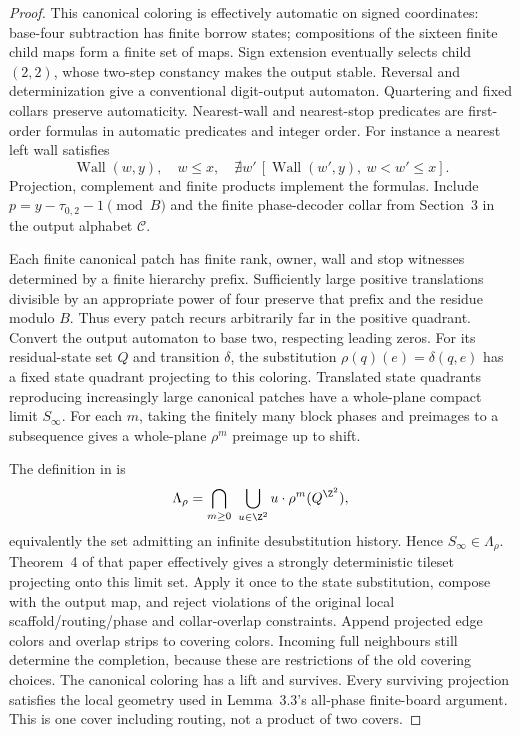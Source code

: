 \begin{proof}
This canonical coloring is effectively automatic on signed coordinates: base-four subtraction has finite borrow states; compositions of the sixteen finite child maps form a finite set of maps. Sign extension eventually selects child $(2,2)$, whose two-step constancy makes the output stable. Reversal and determinization give a conventional digit-output automaton. Quartering and fixed collars preserve automaticity. Nearest-wall and nearest-stop predicates are first-order formulas in automatic predicates and integer order. For instance a nearest left wall satisfies
\[
 \operatorname{Wall}(w,y),\quad w\le x,\quad
 \nexists w'\,[\operatorname{Wall}(w',y),\ w<w'\le x].
\]
Projection, complement and finite products implement the formulas. Include $p=y-\tau_{0,2}-1\pmod B$ and the finite phase-decoder collar from Section~3 in the output alphabet $\mathcal C$.

Each finite canonical patch has finite rank, owner, wall and stop witnesses determined by a finite hierarchy prefix. Sufficiently large positive translations divisible by an appropriate power of four preserve that prefix and the residue modulo $B$. Thus every patch recurs arbitrarily far in the positive quadrant. Convert the output automaton to base two, respecting leading zeros. For its residual-state set $Q$ and transition $\delta$, the substitution $\rho(q)(e)=\delta(q,e)$ has a fixed state quadrant projecting to this coloring. Translated state quadrants reproducing increasingly large canonical patches have a whole-plane compact limit $S_\infty$. For each $m$, taking the finitely many block phases and preimages to a subsequence gives a whole-plane $\rho^m$ preimage up to shift.

The definition in \cite[Section~1]{LGO12} is
\[
 \Lambda_\rho=\bigcap_{m\ge0}\ \bigcup_{u\in\Z^2}
 u\cdot\rho^m(Q^{\Z^2}),
\]
equivalently the set admitting an infinite desubstitution history. Hence $S_\infty\in\Lambda_\rho$. Theorem~4 of that paper effectively gives a strongly deterministic tileset projecting onto this limit set. Apply it once to the state substitution, compose with the output map, and reject violations of the original local scaffold/routing/phase and collar-overlap constraints. Append projected edge colors and overlap strips to covering colors. Incoming full neighbours still determine the completion, because these are restrictions of the old covering choices. The canonical coloring has a lift and survives. Every surviving projection satisfies the local geometry used in Lemma~3.3's all-phase finite-board argument. This is one cover including routing, not a product of two covers.
\end{proof}

